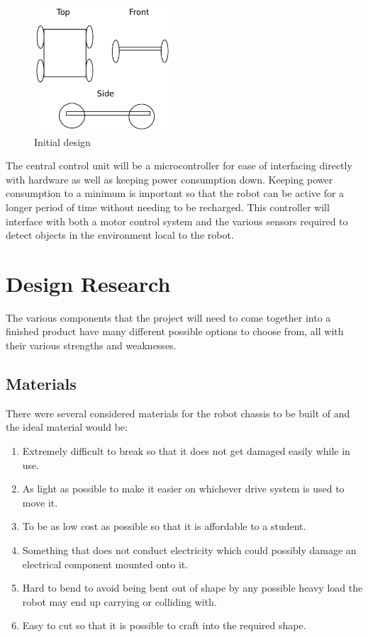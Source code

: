 \begin{figure}[H]
\centering
        \includegraphics[width=2.0in] {Images/initial-design.png}
        \caption{Initial design}
        \label{Initial design}
\end{figure}

The central control unit will be a microcontroller for ease of interfacing directly with hardware as well as keeping power consumption down.  Keeping power consumption to a minimum is important so that the robot can be active for a longer period of time without needing to be recharged.  This controller will interface with both a motor control system and the various sensors required to detect objects in the environment local to the robot.

\section{Design Research}
The various components that the project will need to come together into a finished product have many different possible options to choose from, all with their various strengths and weaknesses.
\subsection{Materials}
There were several considered materials for the robot chassis to be built of and the ideal material would be:
\begin{enumerate}
\item Extremely difficult to break so that it does not get damaged easily while in use.
\item As light as possible to make it easier on whichever drive system is used to move it.
\item To be as low cost as possible so that it is affordable to a student.
\item Something that does not conduct electricity which could possibly damage an electrical component mounted onto it.
\item Hard to bend to avoid being bent out of shape by any possible heavy load the robot may end up carrying or colliding with.
\item Easy to cut so that it is possible to craft into the required shape.
\end{enumerate}


